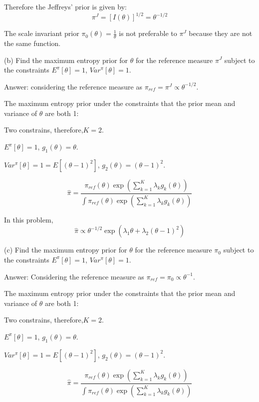 \documentclass{article}
\begin{document}
Therefore the Jeffreys' prior is given by:
\begin{equation}
   \pi^J = \left[I(\theta)\right]^{1/2} = \theta^{-1/2}
\end{equation}

The scale invariant prior $\pi_{0}(\theta) = \frac{1}{\theta}$ is not preferable to $\pi^{J}$ because they are not the same function.

(b) Find the maximum entropy prior for $\theta$ for the reference measure $\pi^J$ subject to the constraints $E^{\pi}[\theta] = 1$, $Var^{\pi}[\theta] = 1$. 

Answer: considering the reference measure as $\pi_{ref}=\pi^J \propto \theta^{-1/2}$.

The maximum entropy prior under the constraints that the prior mean and variance of $\theta$ are both 1:

Two constrains, therefore,$K=2$.

$E^{\pi}[\theta] = 1$, $g_{1}(\theta)=\theta$.

$Var^{\pi}[\theta] = 1= E[(\theta-1)^2]$, $g_{2}(\theta)=(\theta-1)^2$.

\begin{equation}
\hat{\pi} = \frac{\pi_{ref}(\theta)\exp(\sum_{k=1}^{K} \lambda_{k}g_{k}(\theta))}{\int \pi_{ref}(\theta)\exp(\sum_{k=1}^{K} \lambda_{k}g_{k}(\theta))}
\end{equation}

In this problem,
\begin{equation}
\hat{\pi} \propto \theta^{-1/2} \exp(\lambda_{1}\theta+\lambda_{2}(\theta-1)^2)  
\end{equation}

(c) Find the maximum entropy prior for $\theta$ for the reference measure $\pi_0$ subject to the constraints $E^{\pi}[\theta] = 1$, $Var^{\pi}[\theta] = 1$. 

Answer: Considering the reference measure as $\pi_{ref}=\pi_{0} \propto \theta^{-1}$.

The maximum entropy prior under the constraints that the prior mean and variance of $\theta$ are both 1:

Two constrains, therefore,$K=2$.

$E^{\pi}[\theta] = 1$, $g_{1}(\theta)=\theta$.

$Var^{\pi}[\theta] = 1= E[(\theta-1)^2]$, $g_{2}(\theta)=(\theta-1)^2$.

\begin{equation}
\hat{\pi} = \frac{\pi_{ref}(\theta)\exp(\sum_{k=1}^{K} \lambda_{k}g_{k}(\theta))}{\int \pi_{ref}(\theta)\exp(\sum_{k=1}^{K} \lambda_{k}g_{k}(\theta))}    
\end{equation}
\end{document}
